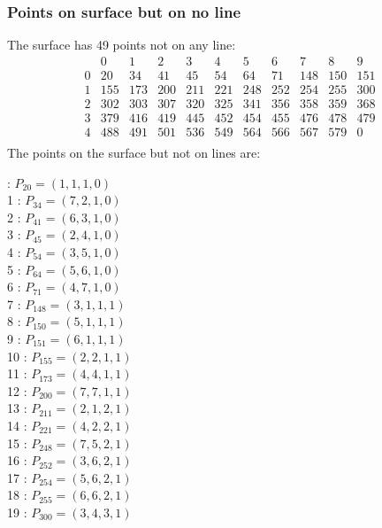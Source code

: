 \documentclass{article}
\begin{document}
{\subsubsection*{Points on surface but on no line}
The surface has 49 points not on any line:\\
$$
\begin{array}{r|*{10}{r}}
 & 0 & 1 & 2 & 3 & 4 & 5 & 6 & 7 & 8 & 9\\
\hline
0 & 20 & 34 & 41 & 45 & 54 & 64 & 71 & 148 & 150 & 151\\
1 & 155 & 173 & 200 & 211 & 221 & 248 & 252 & 254 & 255 & 300\\
2 & 302 & 303 & 307 & 320 & 325 & 341 & 356 & 358 & 359 & 368\\
3 & 379 & 416 & 419 & 445 & 452 & 454 & 455 & 476 & 478 & 479\\
4 & 488 & 491 & 501 & 536 & 549 & 564 & 566 & 567 & 579 & 0\\
\end{array}
$$
The points on the surface but not on lines are:\\
\begin{multicols}{2}
 : $P_{20}=( 1, 1, 1, 0 )$\\
1 : $P_{34}=( 7, 2, 1, 0 )$\\
2 : $P_{41}=( 6, 3, 1, 0 )$\\
3 : $P_{45}=( 2, 4, 1, 0 )$\\
4 : $P_{54}=( 3, 5, 1, 0 )$\\
5 : $P_{64}=( 5, 6, 1, 0 )$\\
6 : $P_{71}=( 4, 7, 1, 0 )$\\
7 : $P_{148}=( 3, 1, 1, 1 )$\\
8 : $P_{150}=( 5, 1, 1, 1 )$\\
9 : $P_{151}=( 6, 1, 1, 1 )$\\
10 : $P_{155}=( 2, 2, 1, 1 )$\\
11 : $P_{173}=( 4, 4, 1, 1 )$\\
12 : $P_{200}=( 7, 7, 1, 1 )$\\
13 : $P_{211}=( 2, 1, 2, 1 )$\\
14 : $P_{221}=( 4, 2, 2, 1 )$\\
15 : $P_{248}=( 7, 5, 2, 1 )$\\
16 : $P_{252}=( 3, 6, 2, 1 )$\\
17 : $P_{254}=( 5, 6, 2, 1 )$\\
18 : $P_{255}=( 6, 6, 2, 1 )$\\
19 : $P_{300}=( 3, 4, 3, 1 )$\\

\end{multicols}}
\end{document}
